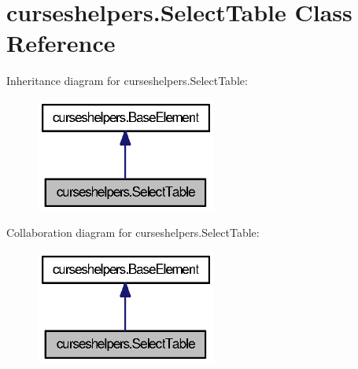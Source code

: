 \section{curseshelpers.\-Select\-Table Class Reference}
\label{classcurseshelpers_1_1SelectTable}


Inheritance diagram for curseshelpers.\-Select\-Table\-:
\nopagebreak
\begin{figure}[H]
\begin{center}
\leavevmode
\includegraphics[width=168pt]{classcurseshelpers_1_1SelectTable__inherit__graph}
\end{center}
\end{figure}


Collaboration diagram for curseshelpers.\-Select\-Table\-:
\nopagebreak
\begin{figure}[H]
\begin{center}
\leavevmode
\includegraphics[width=168pt]{classcurseshelpers_1_1SelectTable__coll__graph}
\end{center}
\end{figure}
